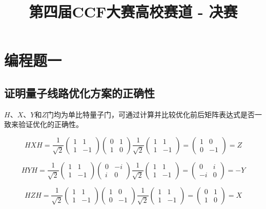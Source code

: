\documentclass[12pt]{article}
\title{第四届CCF大赛高校赛道 - 决赛}
\date{} %
\begin{document}
\maketitle
\vspace{-2em} %

\section{编程题一}
\subsection{证明量子线路优化方案的正确性}

$H$、$X$、$Y$和$Z$门均为单比特量子门，可通过计算并比较优化前后矩阵表达式是否一致来验证优化的正确性。

\[
    HXH = \frac{1}{\sqrt{2}}\begin{pmatrix} 1 & 1 \\ 1 & -1 \end{pmatrix}
    \begin{pmatrix} 0 & 1 \\ 1 & 0 \end{pmatrix}
    \frac{1}{\sqrt{2}}\begin{pmatrix} 1 & 1 \\ 1 & -1 \end{pmatrix}
    = \begin{pmatrix} 1 & 0 \\ 0 & -1 \end{pmatrix} = Z
\]

\[
    HYH = \frac{1}{\sqrt{2}}\begin{pmatrix} 1 & 1 \\ 1 & -1 \end{pmatrix}
    \begin{pmatrix} 0 & -i \\ i & 0 \end{pmatrix}
    \frac{1}{\sqrt{2}}\begin{pmatrix} 1 & 1 \\ 1 & -1 \end{pmatrix}
    = \begin{pmatrix} 0 & i \\ -i & 0 \end{pmatrix} = -Y
\]

\[
    HZH = \frac{1}{\sqrt{2}}\begin{pmatrix} 1 & 1 \\ 1 & -1 \end{pmatrix}
    \begin{pmatrix} 1 & 0 \\ 0 & -1 \end{pmatrix}
    \frac{1}{\sqrt{2}}\begin{pmatrix} 1 & 1 \\ 1 & -1 \end{pmatrix}
    = \begin{pmatrix} 0 & 1 \\ 1 & 0 \end{pmatrix} = X
\]
\end{document}

